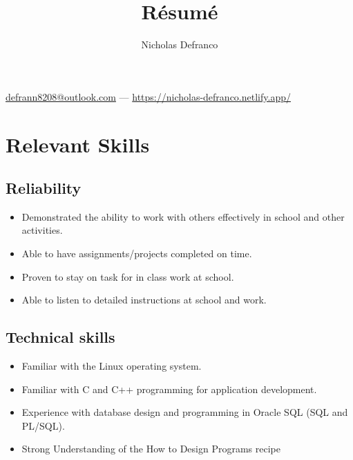 \documentclass{article}
\makeatletter
\renewcommand{\maketitle}{
\begin{center}
{\Large\bfseries
\theauthor}

\vspace{0.75em}

\href{mailto://defrann8208@outlook.com}{defrann8208@outlook.com} ---
\url{https://nicholas-defranco.netlify.app/}

\vspace{0.25em}
%

\end{center}
}
\makeatother
\begin{document}
\title{R\'esum\'e}
\author{Nicholas Defranco}

\maketitle


\section{Relevant Skills}

\subsection{Reliability}

\begin{itemize}

\item Demonstrated the ability to work with others effectively in school and
	other activities.

\item Able to have assignments/projects completed on time.

\item Proven to stay on task for in class work at school.

\item Able to listen to detailed instructions at school and work.

\end{itemize}

\subsection{Technical skills}

\begin{itemize}

\item Familiar with the Linux operating system.

\item Familiar with C and C++ programming for application development.

\item Experience with database design and programming in Oracle SQL (SQL and
	PL/SQL).

\item Strong Understanding of the How to Design Programs recipe

\end{itemize}
\end{document}
